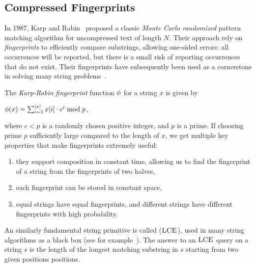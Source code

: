 \subsection{Compressed Fingerprints}
In 1987, Karp and Rabin~\cite{karp1987efficient} proposed a classic \emph{Monte Carlo randomized} pattern matching algorithm for uncompressed text of length $N$. Their approach rely on \emph{fingerprints} to efficiently compare substrings, allowing one-sided errors: all occurrences will be reported, but there is a small risk of reporting occurrences that do not exist.
Their fingerprints have subsequently been used as a cornerstone in solving many string problems~\cite{amir1992efficient, andoni2006efficient, cole2003faster, cormode2005substring, cormode2007string, farach1998string, gasieniec1996randomized, kalai2002efficient, porat2009exact}. 

The \emph{Karp-Rabin fingerprint} function $\phi$ for a string $x$ is given by 
\begin{center}
    $\phi(x) = \sum_{i=1}^{|x|} x[i] \cdot c^i \bmod p$,
\end{center}
where $c < p$ is a randomly chosen positive integer, and $p$ is a prime. 
If choosing prime $p$ sufficiently large compared to the length of $x$, we get multiple key properties that make fingerprints extremely useful:
\begin{enumerate}
    \item they support composition in constant time, allowing us to find the fingerprint of a string from the fingerprints of two halves,
    \item each fingerprint can be stored in constant space,
    \item equal strings have equal fingerprints, and different strings have different fingerprints with high probability.
\end{enumerate}

An similarly fundamental string primitive is called  ($\textsc{LCE}$), used in many string algorithms as a black box (see for example~\cite{amir1992efficient, andoni2006efficient, cole2003faster, cormode2005substring, cormode2007string, farach1998string, gasieniec1996randomized, kalai2002efficient, porat2009exact}). The answer to an $\textsc{LCE}$ query on a string $s$ is the length of the longest matching substring in $s$ starting from two given positions positions. 

